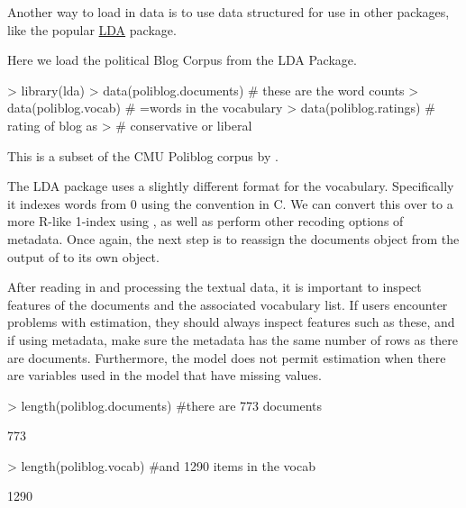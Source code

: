 \documentclass[nojss]{jss}
\begin{document}
Another way to load in data is to use data structured for use in other packages, like the popular \href{http://cran.r-project.org/web/packages/lda/}{LDA} package.

Here we load the political Blog Corpus from the LDA Package.
\begin{Schunk}
\begin{Sinput}
> library(lda)
> data(poliblog.documents) # these are the word counts
> data(poliblog.vocab)     # =words in the vocabulary
> data(poliblog.ratings)   # rating of blog as
>                          # conservative or liberal
\end{Sinput}
\end{Schunk}
This is a subset of the CMU Poliblog corpus by \cite{poliblog}.

The LDA package uses a slightly different format for the vocabulary. Specifically it indexes words from 0 using the convention in C. We can convert this over to a more R-like 1-index using , as well as perform other recoding options of metadata. Once again, the next step is to reassign the documents object from the output of  to its own object.

\begin{Schunk}
\end{Schunk}



After reading in and processing the textual data, it is important to inspect features of the documents and the associated vocabulary list. If users encounter problems with estimation, they should always inspect features such as these, and if using metadata, make sure the metadata has the same number of rows as there are documents. Furthermore, the model does not permit estimation when there are variables used in the model that have missing values.

\begin{Schunk}
\begin{Sinput}
> length(poliblog.documents) #there are 773 documents
\end{Sinput}
\begin{Soutput}
[1] 773
\end{Soutput}
\begin{Sinput}
> length(poliblog.vocab)     #and 1290 items in the vocab
\end{Sinput}
\begin{Soutput}
[1] 1290
\end{Soutput}
\end{Schunk}
\end{document}
